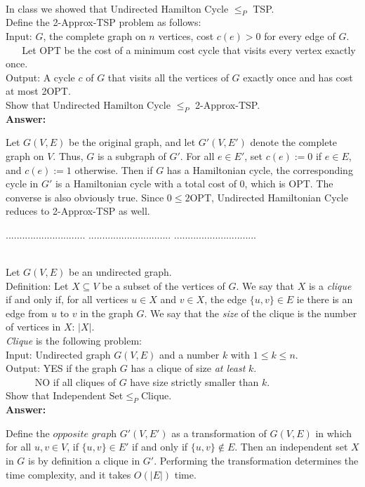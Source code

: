 \documentclass[a4paper,11pt]{article}
\begin{document}
\\
In class we showed that Undirected Hamilton Cycle $\leq_P$ TSP.\\
Define the 2-Approx-TSP problem as follows: \\
Input: $G$, the complete graph on $n$ vertices, cost $c(e)>0$ for every edge of $G$. \\
$~~~~~~$ Let OPT be the cost of a minimum cost cycle that visits every vertex exactly once.\\
Output: A cycle $c$ of $G$ that visits all the vertices of $G$ exactly once
and has cost at most 2OPT.\\
Show that Undirected Hamilton Cycle $\leq_P$ 2-Approx-TSP. \\
{\bf Answer:} \par
Let $G(V, E)$ be the original graph, and let $G'(V, E')$ denote the complete graph on $V$. Thus, $G$ is a subgraph of $G'$. For all $e \in E'$, set $c(e) := 0$ if $e \in E$, and $c(e) := 1$ otherwise. Then if $G$ has a Hamiltonian cycle, the corresponding cycle in $G'$ is a Hamiltonian cycle with a total cost of $0$, which is OPT. The converse is also obviously true. Since $0 \leq 2$OPT, Undirected Hamiltonian Cycle reduces to 2-Approx-TSP as well.

\pagebreak

 $.............................$
 $..............................$
          $..............................$\\

\bigskip

\\
Let $G(V,E)$ be an undirected graph.\\
Definition: Let $X \subseteq V$ be a subset of the vertices of $G$. 
We say that $X$ is a {\em clique} if and only if, for all vertices $u\in X$ and $v\in X$, 
the edge $\{ u , v \} \in E$ ie there is an edge from $u$ to $v$ in the graph $G$. 
We say that the {\em size} of the clique is the number of vertices in $X$: $|X|$. \\
{\em Clique} is the following problem:\\
Input: Undirected graph $G(V,E)$ and a number $k$ with $1\leq k \leq n$. \\
Output: YES if the graph $G$ has a clique of size {\em at least } $k$.\\
$~~~~~~~~~~~~$ NO if all cliques of $G$ have size strictly smaller than $k$.\\
Show that Independent Set$\leq_P$Clique. \\
{\bf Answer:} \par
Define the $\textit{opposite graph}$ $G'(V, E')$ as a transformation of $G(V, E)$ in which for all $u, v \in V$, if $\{ u, v \} \in E'$ if and only if $\{ u, v \} \notin E$. Then an independent set $X$ in $G$ is by definition a clique in $G'$. Performing the transformation determines the time complexity, and it takes $O(|E|)$ time.
\end{document}
